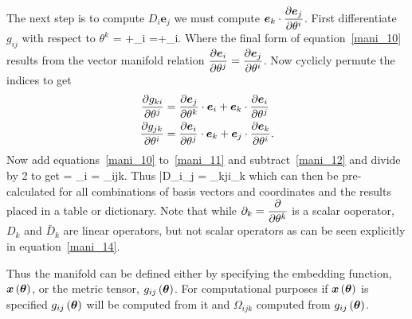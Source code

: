 The next step is to compute $D_{i}\bm{e}_{j}$ we must compute $\bm{e}_{k}\cdot\displaystyle\frac{\partial{\bm{e}_{j}}}{\partial{\theta^{i}}}$.  First differentiate
$g_{ij}$ with respect to $\theta^{k}$
\be
     = +_{i}\cdot{}
                               =+_{i}\cdot{}\label{mani_10}.
\ee
Where the final form of equation~\ref{mani_10} results from the vector manifold relation 
$\displaystyle\frac{\partial{\bm{e}_{i}}}{\partial{\theta^{j}}} = \displaystyle\frac{\partial{\bm{e}_{j}}}{\partial{\theta^{i}}}$.  Now cyclicly permute the indices to get
\begin{align}
    \displaystyle\frac{\partial{g_{ki}}}{\partial{\theta^{j}}} &= \displaystyle\frac{\partial{\bm{e}_{j}}}{\partial{\theta^{k}}}\cdot{\bm{e}_{i}}+\bm{e}_{k}\cdot\displaystyle\frac{\partial{\bm{e}_{i}}}{\partial{\theta^{j}}} \label{mani_11}\\
    \displaystyle\frac{\partial{g_{jk}}}{\partial{\theta^{i}}} &= \displaystyle\frac{\partial{\bm{e}_{i}}}{\partial{\theta^{j}}}\cdot{\bm{e}_{k}}+\bm{e}_{j}\cdot\displaystyle\frac{\partial{\bm{e}_{k}}}{\partial{\theta^{i}}} \label{mani_12}.
\end{align}
Now add equations~\ref{mani_10} to~\ref{mani_11} and subtract~\ref{mani_12} and divide by 2 to get
\be
   \half{} = _{i}\cdot{} = \Omega_{ijk}\label{mani_13}.
\ee 
Thus
\be
    \bar{D}_{i}_{j} = \Omega_{kji}_{k}\label{mani_14}
\ee
which can then be pre-calculated for all combinations of basis vectors and coordinates and the results placed in a table or
dictionary.  Note that while $\partial_{k} = \displaystyle\frac{\partial{}}{\partial{\theta^{k}}}$ is a scalar ooperator, $D_{k}$ and $\bar{D}_{k}$ are 
linear operators, but not scalar operators as can be seen explicitly in equation~\ref{mani_14}.

Thus the manifold can be defined either by specifying the embedding function, ${\bm{x}}\left ( {\bm{\theta}} \right )$, or the metric
tensor, ${g_{ij}}\left ( {\bm{\theta}} \right )$.  For computational purposes if ${\bm{x}}\left ( {\bm{\theta}} \right )$ is specified ${g_{ij}}\left ( {\bm{\theta}} \right )$
will be computed from it and $\Omega_{ijk}$ computed from ${g_{ij}}\left ( {\bm{\theta}} \right )$.

